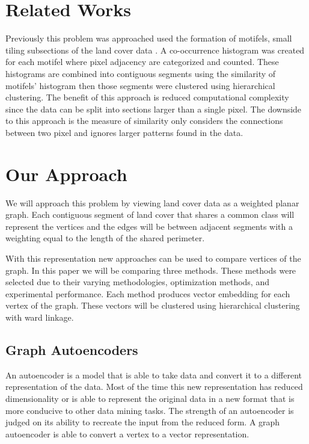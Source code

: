 \documentclass[journal,compsoc]{IEEEtran}
\begin{document}
\section{Related Works}
Previously this problem was approached used the formation of motifels, small tiling subsections of the land cover data \cite{doi:10.1080/13658816.2015.1134796}. A co-occurrence histogram was created for each motifel where pixel adjacency are categorized and counted. These histograms are combined into contiguous segments using the similarity of motifels' histogram then those segments were clustered using hierarchical clustering. The benefit of this approach is reduced computational complexity since the data can be split into sections larger than a single pixel. The downside to this approach is the measure of similarity only considers the connections between two pixel and ignores larger patterns found in the data.


\section{Our Approach}
We will approach this problem by viewing land cover data as a weighted planar graph. Each contiguous segment of land cover that shares a common class will represent the vertices and the edges will be between adjacent segments with a weighting equal to the length of the shared perimeter. 

With this representation new approaches can be used to compare vertices of the graph. In this paper we will be comparing three methods. These methods were selected due to their varying methodologies, optimization methods, and experimental performance. Each method produces vector embedding for each vertex of the graph. These vectors will be clustered using hierarchical clustering with ward linkage.

\subsection{Graph Autoencoders \cite{SalhaGalvan2019KeepIS}}
An autoencoder is a model that is able to take data and convert it to a different representation of the data. Most of the time this new representation has reduced dimensionality or is able to represent the original data in a new format that is more conducive to other data mining tasks. The strength of an autoencoder is judged on its ability to recreate the input from the reduced form. A graph autoencoder is able to convert a vertex to a vector representation.
\end{document}
